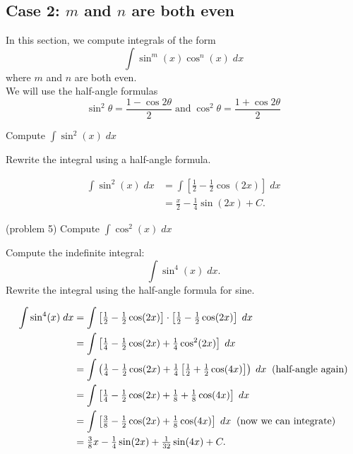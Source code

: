 \documentclass{ximera}
\begin{document}
\subsection{Case 2: $m$ and $n$ are both even}
In this section, we compute integrals of the form
\[
\int \sin^m(x) \cos^n(x) \; dx
\]
where $m$ and $n$ are both even.\\
We will use the half-angle formulas
\[
\sin^2 \theta = \frac{1 - \cos 2\theta}{2} \; \text{and} \; \cos^2 \theta = \frac{1 + \cos 2\theta}{2}
\]

\begin{example}[example 5]
Compute $\displaystyle{\int \sin^2(x) \; dx}$

Rewrite the integral using a half-angle formula.

\begin{align*}
\int \sin^2(x) \; dx &= \int \left[\frac12- \frac12\cos(2x)\right]  \; dx\\
  &= \frac{x}{2}  - \frac{1}{4}\sin(2x) + C.
\end{align*}
\end{example}

\begin{problem}(problem 5)
Compute $\displaystyle{\int \cos^2(x) \; dx}$
\begin{multipleChoice}
\end{multipleChoice}
\end{problem}

\begin{example}[example 6]
Compute the indefinite integral:
\[
\int \sin^4(x) \; dx.
\]
Rewrite the integral using the half-angle formula for sine.

\begin{align*}
\int \sin^4(x) \; dx &= \int \left[\tfrac12- \tfrac12\cos(2x)\right] \cdot \left[\tfrac12 - \tfrac12\cos(2x)\right] \; dx\\
  &=  \int \left[\tfrac14 - \tfrac12\cos(2x) + \tfrac14\cos^2(2x)\right] \; dx \\
  &= \int \left( \tfrac14 - \tfrac12 \cos(2x) + \tfrac14 
  \left[\tfrac12 + \tfrac12\cos(4x)\right]\right) \; dx  \;\; \textup{(half-angle again)} \\
  &= \int \left[\tfrac14 - \tfrac12 \cos(2x) +\tfrac18 + \tfrac18\cos(4x)\right] \; dx\\
  &=  \int \left[\tfrac38 - \tfrac12 \cos(2x) + \tfrac18\cos(4x)\right] \; dx \;\; \textup{(now we can integrate)}\\
  &= \tfrac38 x - \tfrac14 \sin(2x) + \tfrac{1}{32}\sin(4x) + C.
\end{align*}
\end{example}
\end{document}
